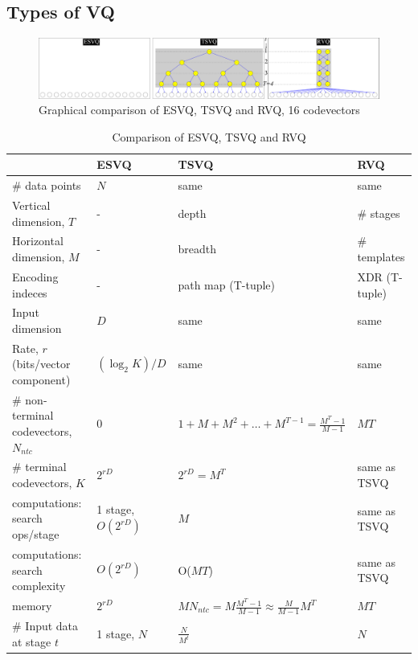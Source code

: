 \subsection{Types of VQ}
\begin{figure}[htp]				
	\includegraphics[width=1.1\textwidth]{thesis/RVQ_comparisonWithESVQ_TSVQ.pdf}
	\caption{Graphical comparison of ESVQ, TSVQ and RVQ, 16 codevectors}
	\label{fig:comparison_ESVQ_TSVQ_RVQ}
\end{figure}

\begin{table}[htp]
\begin{longtable}{| p{2.2in} || p{1in} | p{1.5in} | p{1.5in}|}
\hline
											&ESVQ						&TSVQ																&RVQ								\\ 
\hline
\# data points								&$N$						&same																&same								\\ 
\hline
Vertical dimension, $T$					&-							&depth																&\# stages							\\
Horizontal dimension, $M$					&-							&breadth															&\# templates						\\
Encoding indeces							&-							&path map	(T-tuple)												&XDR (T-tuple)						\\ 
\hline
Input dimension							&$D$						&same																&same								\\
Rate, $r$ (bits/vector component)			&$(\log_2K)/D$			&same																&same								\\ 
\hline
\# non-terminal codevectors, $N_{ntc}$	&0							&$1+M+M^2+ \ldots + M^{T-1}=\frac{M^T-1}{M-1}$			&$MT$								\\
\# terminal codevectors, $K$				&$2^{rD}$					&$2^{rD}=M^T$													&same as TSVQ					\\
\hline
computations: search ops/stage			&1 stage, $O(2^{rD})$	&$M$																&same as TSVQ					\\
computations: search complexity 			&$O(2^{rD})$				&O($MT$)															&same  as TSVQ					\\ 
memory 									&$2^{rD}$					&$MN_{ntc} = M\frac{M^T-1}{M-1}\approx\frac{M}{M-1}M^T$ &$MT$								\\ 
\hline
\# Input data at stage $t$					&1 stage, $N$				&$\frac{N}{M^t}$													&$N$								\\
\hline
\end{longtable}
\caption{Comparison of ESVQ, TSVQ and RVQ}
\label{tab:comparison_ESVQ_TSVQ_RVQ}
\end{table}
